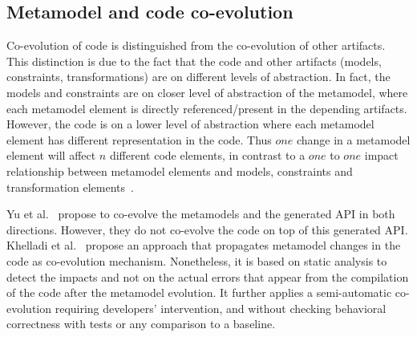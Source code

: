  \subsection{Metamodel and code co-evolution}
 Co-evolution of code is distinguished from the co-evolution of other artifacts. This distinction is due to the fact that the code and other artifacts (models, constraints, transformations) are on different levels of abstraction. In fact, the models and constraints are on closer level of abstraction of the metamodel, where each metamodel element is directly referenced/present in the depending artifacts. However, the code is on a lower level of abstraction where each  metamodel element has different representation in the code. Thus $one$ change in a metamodel element will affect $n$ different code elements, in contrast to a $one$ to $one$ impact relationship between metamodel elements and models, constraints and transformation elements~\cite{kessentini2018integrating,kessentini2019automated,cicchetti2008automating,herrmannsdoerfer2009cope,garces2009managing,wachsmuth2007metamodel,batot2017heuristic,khelladi2017semi,correa2007refactoring,kessentini2018automated,khelladi2018change,garces2014adapting,10.1007/978-3-642-36089-3_9,kusel2015consistent,kusel2015systematic}.
 
 Yu et al.~\cite{yu2012maintaining} propose to co-evolve the metamodels and the generated API in both directions. However, they do not co-evolve the code on top of this generated API.
  Khelladi et al.~\cite{Khelladi2020} propose an approach that propagates metamodel changes in the code as co-evolution mechanism. Nonetheless, it is based on static analysis to detect the impacts and not on the actual errors that appear from the compilation of the code after the metamodel evolution. It further applies a semi-automatic co-evolution requiring developers' intervention, and without checking behavioral correctness with tests or any comparison to a baseline. 
 
